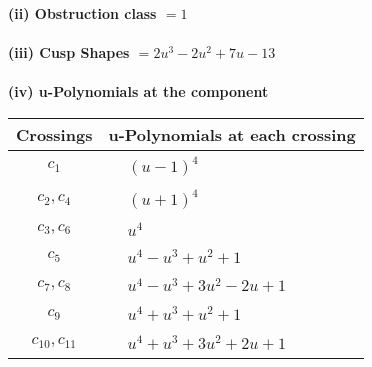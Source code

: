\documentclass[1p]{elsarticle_modified}
\theoremstyle{definition}
\begin{document}
\flushleft \textbf{(ii) Obstruction class $= 1$}\\~\\
\flushleft \textbf{(iii) Cusp Shapes $= 2 u^3-2 u^2+7 u-13$}\\~\\
\newpage\renewcommand{\arraystretch}{1}
\flushleft \textbf{(iv) u-Polynomials at the component}\newline \\
\begin{tabular}{m{50pt}|m{274pt}}
Crossings & \hspace{64pt}u-Polynomials at each crossing \\
\hline $$\begin{aligned}c_{1}\end{aligned}$$&$\begin{aligned}
&(u-1)^4
\end{aligned}$\\
\hline $$\begin{aligned}c_{2},c_{4}\end{aligned}$$&$\begin{aligned}
&(u+1)^4
\end{aligned}$\\
\hline $$\begin{aligned}c_{3},c_{6}\end{aligned}$$&$\begin{aligned}
&u^4
\end{aligned}$\\
\hline $$\begin{aligned}c_{5}\end{aligned}$$&$\begin{aligned}
&u^4- u^3+u^2+1
\end{aligned}$\\
\hline $$\begin{aligned}c_{7},c_{8}\end{aligned}$$&$\begin{aligned}
&u^4- u^3+3 u^2-2 u+1
\end{aligned}$\\
\hline $$\begin{aligned}c_{9}\end{aligned}$$&$\begin{aligned}
&u^4+u^3+u^2+1
\end{aligned}$\\
\hline $$\begin{aligned}c_{10},c_{11}\end{aligned}$$&$\begin{aligned}
&u^4+u^3+3 u^2+2 u+1
\end{aligned}$\\
\hline
\end{tabular}\\~\\
\end{document}

